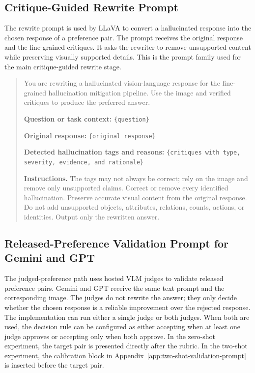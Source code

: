 \documentclass{article}
\begin{document}
\subsection{Critique-Guided Rewrite Prompt}
\label{app:rewrite-prompt}

The rewrite prompt is used by LLaVA to convert a hallucinated response into the chosen response of a preference pair. The prompt receives the original response and the fine-grained critiques. It asks the rewriter to remove unsupported content while preserving visually supported details. This is the prompt family used for the main critique-guided rewrite stage.

\begin{quote}
\small
You are rewriting a hallucinated vision-language response for the fine-grained hallucination mitigation pipeline. Use the image and verified critiques to produce the preferred answer.

\textbf{Question or task context:}
\texttt{\{question\}}

\textbf{Original response:}
\texttt{\{original response\}}

\textbf{Detected hallucination tags and reasons:}
\texttt{\{critiques with type, severity, evidence, and rationale\}}

\textbf{Instructions.}
The tags may not always be correct; rely on the image and remove only unsupported claims. Correct or remove every identified hallucination. Preserve accurate visual content from the original response. Do not add unsupported objects, attributes, relations, counts, actions, or identities. Output only the rewritten answer.
\end{quote}

\subsection{Released-Preference Validation Prompt for Gemini and GPT}
\label{app:api-validation-prompt}

The judged-preference path uses hosted VLM judges to validate released preference pairs. Gemini and GPT receive the same text prompt and the corresponding image. The judges do not rewrite the answer; they only decide whether the chosen response is a reliable improvement over the rejected response. The implementation can run either a single judge or both judges. When both are used, the decision rule can be configured as either accepting when at least one judge approves or accepting only when both approve. In the zero-shot experiment, the target pair is presented directly after the rubric. In the two-shot experiment, the calibration block in Appendix~\ref{app:two-shot-validation-prompt} is inserted before the target pair.
\end{document}
